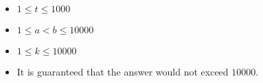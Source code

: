 \begin{itemize}
\tightlist
\item $1 \leq t \leq 1000$
\item $1 \leq a < b \leq 10000$
\item $1 \leq k \leq 10000$
\item It is guaranteed that the answer would not exceed $10000$.
\end{itemize}
